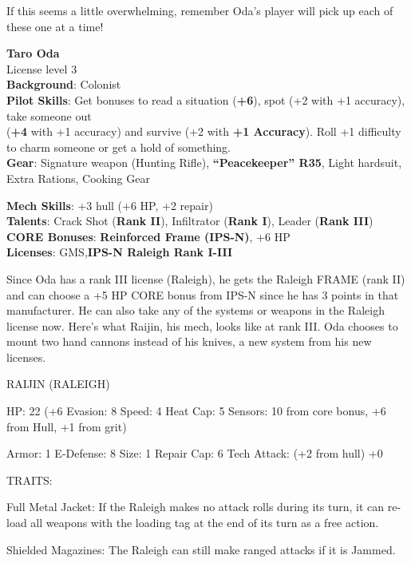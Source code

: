 If this seems a little overwhelming, remember Oda’s player will pick up each of these one at a time! 

\textbf{Taro Oda}\\
License level 3\\
\textbf{Background}: Colonist\\
\textbf{Pilot Skills}: Get bonuses to read a situation (\textbf{+6}), spot (+2 with +1 accuracy), take someone out\\
(\textbf{+4} with +1 accuracy) and survive (+2 with \textbf{+1 Accuracy}). Roll +1 difficulty to charm someone or get a hold of something.\\
\textbf{Gear}: Signature weapon (Hunting Rifle), \textbf{“Peacekeeper” R35}, Light hardsuit, Extra Rations, Cooking Gear

\textbf{Mech Skills}: +3 hull (+6 HP, +2 repair)\\
\textbf{Talents}: Crack Shot (\textbf{Rank II}), Infiltrator (\textbf{Rank I}), Leader (\textbf{Rank III})\\
\textbf{CORE Bonuses}: \textbf{Reinforced Frame (IPS-N)}, +6 HP\\
\textbf{Licenses}: GMS,\textbf{IPS-N Raleigh Rank I-III}

Since Oda has a rank III license (Raleigh), he gets the Raleigh FRAME (rank II) and can choose a +5 HP CORE bonus from IPS-N since he has 3 points in that manufacturer. He can also take any of the systems or weapons in the Raleigh license now. Here’s what Raijin, his mech, looks like at rank III. Oda chooses to mount two hand cannons instead of his knives, a new system from his new licenses.

                                            RAIJIN (RALEIGH)

 HP: 22 (+6      Evasion: 8                            Speed: 4            Heat Cap: 5        Sensors: 10
 from core
 bonus, +6
 from Hull,
 +1 from grit)

 Armor: 1        E-Defense: 8                          Size: 1             Repair Cap: 6      Tech Attack:
                                                                           (+2 from hull)     +0

                                                    TRAITS:

 Full Metal Jacket: If the Raleigh makes no attack rolls during its turn, it can re-load all weapons with
 the loading tag at the end of its turn as a free action.

 Shielded Magazines: The Raleigh can still make ranged attacks if it is Jammed.

